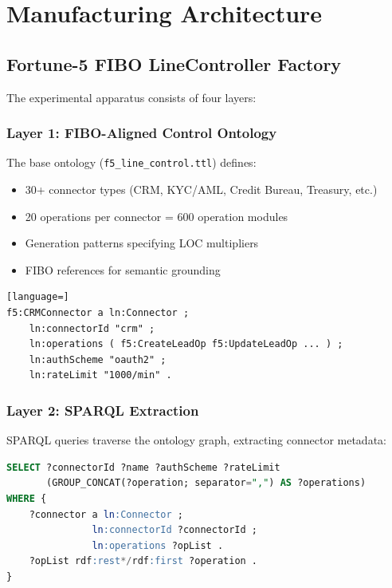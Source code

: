 \chapter{Manufacturing Architecture}
\label{ch:architecture}

\section{Fortune-5 FIBO LineController Factory}

The experimental apparatus consists of four layers:

\subsection{Layer 1: FIBO-Aligned Control Ontology}

The base ontology (\texttt{f5\_line\_control.ttl}) defines:
\begin{itemize}
    \item 30+ connector types (CRM, KYC/AML, Credit Bureau, Treasury, etc.)
    \item 20 operations per connector = 600 operation modules
    \item Generation patterns specifying LOC multipliers
    \item FIBO references for semantic grounding
\end{itemize}

\begin{lstlisting}[language=]
f5:CRMConnector a ln:Connector ;
    ln:connectorId "crm" ;
    ln:operations ( f5:CreateLeadOp f5:UpdateLeadOp ... ) ;
    ln:authScheme "oauth2" ;
    ln:rateLimit "1000/min" .
\end{lstlisting}

\subsection{Layer 2: SPARQL Extraction}

SPARQL queries traverse the ontology graph, extracting connector metadata:

\begin{lstlisting}[language=SQL]
SELECT ?connectorId ?name ?authScheme ?rateLimit
       (GROUP_CONCAT(?operation; separator=",") AS ?operations)
WHERE {
    ?connector a ln:Connector ;
               ln:connectorId ?connectorId ;
               ln:operations ?opList .
    ?opList rdf:rest*/rdf:first ?operation .
}
\end{lstlisting}

